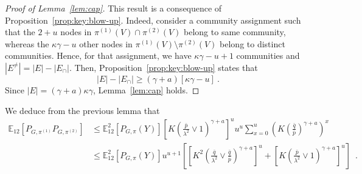\documentclass[final]{colt2026}
\newcommand{\1}{\mathbf{1}}
\newcommand{\bbE}{\mathbb{E}}
\newcommand{\cro}[1]{\left[#1\right]}
\begin{document}
\begin{proof}[Proof of Lemma~\ref{lem:cap}]
This result is a consequence of Proposition~\ref{prop:key:blow-up}. Indeed, consider a community assignment such that the $2+u$ nodes in $\pi^{(1)}(V)\cap \pi^{(2)}(V)$ belong to same community, whereas the $\kappa \gamma-u$ other nodes in $\pi^{(1)}(V)\setminus \pi^{(2)}(V)$ belong to distinct communities. Hence, for that assignment, we have $\kappa\gamma - u + 1$ communities and $|E^{\neq}|= |E|-|E_{\cap}|$. Then, Proposition~\ref{prop:key:blow-up} states that 
\[
|E|-|E_{\cap}|\geq (\gamma+a)[\kappa\gamma -u]\  .
\]
Since $|E|=(\gamma+a )\kappa \gamma$, Lemma~\ref{lem:cap} holds. 
\end{proof}



We deduce from the previous lemma that 
\begin{align}\nonumber
\bbE_{12}\cro{P_{G,\pi^{(1)}}P_{G,\pi^{(2)}}}&\leq \bbE^2_{12}\cro{P_{G,\pi}(Y)}  \left[K \left(\frac{\bar p}{\lambda^2}\vee 1\right)^{\gamma + a}\right]^u    u^u \sum_{x = 0 }^{u} \left(K \left(\frac{\bar q }{\bar p}\right)^{\gamma +a}\right)^{x }\\ 
&\leq \bbE^2_{12}\cro{P_{G,\pi}(Y)}  u^{u+1} \left[\left[K^2  \left(\frac{\bar{q}}{\lambda^2}\vee \frac{\bar{q}}{\bar p } \right)^{\gamma + a}\right]^u  + \left[K \left(\frac{\bar{p}}{\lambda^2}\vee 1 \right)^{\gamma + a}\right]^u   \right] \enspace . \label{eq:upper:covariance:u:blow-up}
\end{align}
\end{document}
